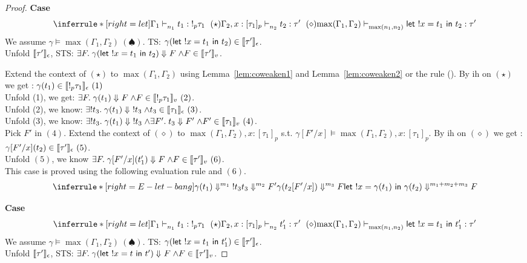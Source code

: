 \documentclass{article}
\begin{document}
\begin{proof}
 
  \noindent \textbf{Case} 
  \[
    \inferrule*[ right = let ]
   {\Gamma_1 \jtype{n_1}{}{t_1}{!_p \tau_1}~(\star) \\ \Gamma_2, x: [\tau_1]_p \jtype{n_2}{}{t_2}{\tau'}~(\diamond)}
   { \max(\Gamma_1,\Gamma_2) \jtype{\max(n_1,n_2)}{}{\letx{!x}{t_1}{t_2}}{\tau'}  }
  \]
  We assume $\gamma \vDash \max(\Gamma_1,\Gamma_2 ) ~(\spadesuit) $.
  TS: $ \gamma ( \mathrel{ \mathsf{let}\ {!x} = {t_1} \ \mathsf{in} \ {t_2} } ) \in \llbracket { \tau'} \rrbracket_{\epsilon} $. \\
  Unfold $ \llbracket { \tau'} \rrbracket_{\epsilon} $, STS: $\exists F. \mathrel{ {\gamma ( \mathrel{ \mathsf{let}\ {!x} = {t_1} \ \mathsf{in} \ {t_2} } )} \Downarrow^{} {F} } \land F \in \llbracket { \tau'} \rrbracket_{v} $.
  
  Extend the context of $(\star)$ to $\max(\Gamma_1,\Gamma_2)$ using Lemma~\ref{lem:coweaken1} and Lemma~\ref{lem:coweaken2} or the rule (). By ih on $(\star)$ we get : $ \gamma(t_1) \in \llbracket {!_p \tau_1 } \rrbracket_{\epsilon} ~(1) $\\
  Unfold (1), we get: $\exists F. \mathrel{ {\gamma(t_1)} \Downarrow^{} {F} } \land F \in \llbracket { !_p \tau_1} \rrbracket_{v}~(2)  $.\\
  Unfold (2), we know: $ \exists !t_3. \mathrel{ {\gamma(t_1)} \Downarrow^{} {!t_3} } \land t_3 \in \llbracket {  \tau_1} \rrbracket_{\epsilon}~(3)$. \\
 Unfold (3), we know: $ \exists !t_3. \mathrel{ {\gamma(t_1)} \Downarrow^{} {!t_3} } \land \exists F'. \mathrel{ {t_3} \Downarrow^{} {F'} } \land F' \in \llbracket {  \tau_1} \rrbracket_{v}~(4)$. \\
  Pick $F' $ in $(4)$. Extend the context of $(\diamond)$ to $\max(\Gamma_1,\Gamma_2), x:[\tau_1]_p$ s.t. $\gamma [F'/x] \vDash{\max(\Gamma_1,\Gamma_2), x:[\tau_1]_p} $. By ih on $(\diamond)$ we get : $ \gamma[F'/x](t_2) \in \llbracket { \tau' } \rrbracket_{\epsilon} ~(5)$. \\
  Unfold $(5)$, we know $\exists F. \mathrel{ {\gamma[F'/x](t_1')} \Downarrow^{} {F} }\land F \in \llbracket {\tau'} \rrbracket_{v} ~(6) $.\\
  
  This case is proved using the following evaluation rule  and $(6)$.
   \[
   \inferrule*[ right=E-let-bang]
  {   
    { \eval{ \gamma(t_1)  }{ !t_3  }{m_1} } 
    \\
    {\eval{t_3}{F'}{m_2}}
    \\
    { \eval{\gamma(t_2[F'/x]) }{ F}{m_3 } }
  }
  { \eval{  \letx{!x}{\gamma (t_1)}{\gamma(t_2)}  }{ F  }{ m_1+m_2+m_3  } }  
   \]
  
  \noindent \textbf{Case} 
  \[
    \inferrule*[ right = let ]
   {\Gamma_1 \jtype{n_1}{}{t_1}{!_p \tau_1}~(\star) \\ \Gamma_2, x: [\tau_1]_p \jtype{n_2}{}{t_1'}{\tau'}~(\diamond)}
   { \max(\Gamma_1,\Gamma_2) \jtype{\max(n_1,n_2)}{}{\letx{!x}{t_1}{t_1'}}{\tau'}  }
  \]
  We assume $\gamma \vDash \max(\Gamma_1,\Gamma_2 ) ~(\spadesuit) $.
  TS: $ \gamma ( \mathrel{ \mathsf{let}\ {!x} = {t_1} \ \mathsf{in} \ {t_1'} } ) \in \llbracket { \tau'} \rrbracket_{\epsilon} $. \\
  Unfold $ \llbracket { \tau'} \rrbracket_{\epsilon} $, STS: $\exists F. \mathrel{ {\gamma ( \mathrel{ \mathsf{let}\ {!x} = {t} \ \mathsf{in} \ {t'} } )} \Downarrow^{} {F} } \land F \in \llbracket { \tau'} \rrbracket_{v} $.
  

\end{proof}
\end{document}
